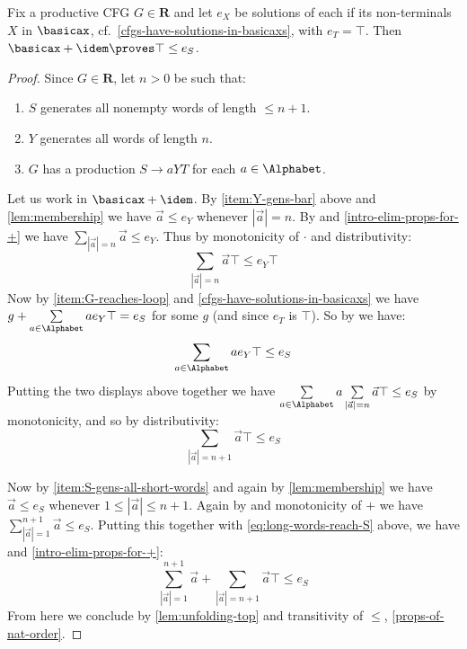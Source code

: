 \begin{proposition}
\label{reg-tot-provable-with-idem}
    Fix a productive CFG $G \in \mathbf R$ and let $e_X$ be solutions of each if its non-terminals $X$ in $\basicax$, cf.~\cref{cfgs-have-solutions-in-basicaxs}, with $e_T = \top$. 
    Then $\basicax + \idem \proves \top \leq e_S$.
\end{proposition}
\begin{proof}
Since $G\in \mathbf R$, let $n>0$ be such that:
\begin{enumerate}
    \item\label{item:S-gens-all-short-words} $S$ generates all nonempty words of length $\leq  n+1$.
    \item\label{item:Y-gens-bar} $Y$ generates all words of length $n$.
    \item\label{item:G-reaches-loop} $G$ has a production $S \to aYT$ for each $a \in \Alphabet$.
\end{enumerate}
    Let us work in $\basicax + \idem$. 
    By \eqref{item:Y-gens-bar} above and \cref{lem:membership} we have
    $ \vec a \leq e_Y$ whenever $|\vec a| = n$.
    By  and \cref{intro-elim-props-for-+} we have $\sum\limits_{|\vec a| = n}\vec a \leq e_Y $.
    Thus by monotonicity of $\cdot$ and distributivity:
    $$\sum\limits_{|\vec a| = n}\vec a \top \leq e_Y\top$$
    Now by \eqref{item:G-reaches-loop} and \cref{cfgs-have-solutions-in-basicaxs} we have $g + \sum\limits_{a \in \Alphabet}ae_Y\top = e_S$ for some $g$ (and since $e_T$ is $\top$).
    So by  we have:
    $$\sum\limits_{a \in \Alphabet} ae_Y\top \leq e_S$$
    Putting the two displays above together we have $\sum\limits_{a \in \Alphabet} a\sum\limits_{|\vec a| = n}\vec a \top \leq e_S$ by monotonicity, and so by distributivity:
    \begin{equation}
    \label{eq:long-words-reach-S}
        \sum\limits_{|\vec a| = n+1}\vec a \top \leq e_S
    \end{equation}
    
    Now by \eqref{item:S-gens-all-short-words} and again by \cref{lem:membership} we have $\vec a \leq e_S$ whenever $1 \leq |\vec a|\leq n+1$. 
    Again by  and monotonicity of $+$ we have 
    $\sum\limits_{|\vec a|=1}^{n+1} \vec a \leq e_S$.
    Putting this together with \eqref{eq:long-words-reach-S} above, we have  and \cref{intro-elim-props-for-+}:
    $$\sum\limits_{|\vec a|=1}^{n+1} \vec a  + \sum\limits_{|\vec a| = n+1}\vec a \top \leq e_S$$
    From here we conclude by \cref{lem:unfolding-top} and transitivity of $\leq$, \cref{props-of-nat-order}.
\end{proof}

